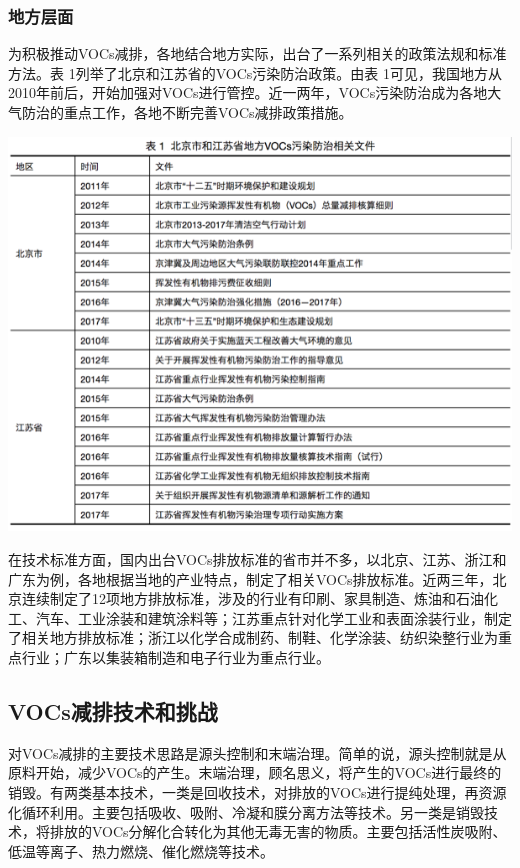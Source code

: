 \documentclass[]{book}
\begin{document}
\subsubsection{地方层面}

为积极推动VOCs减排，各地结合地方实际，出台了一系列相关的政策法规和标准方法。表
1列举了北京和江苏省的VOCs污染防治政策。由表
1可见，我国地方从2010年前后，开始加强对VOCs进行管控。近一两年，VOCs污染防治成为各地大气防治的重点工作，各地不断完善VOCs减排政策措施。

\includegraphics[width=8.33in]{images/voc7}

在技术标准方面，国内出台VOCs排放标准的省市并不多，以北京、江苏、浙江和广东为例，各地根据当地的产业特点，制定了相关VOCs排放标准。近两三年，北京连续制定了12项地方排放标准，涉及的行业有印刷、家具制造、炼油和石油化工、汽车、工业涂装和建筑涂料等；江苏重点针对化学工业和表面涂装行业，制定了相关地方排放标准；浙江以化学合成制药、制鞋、化学涂装、纺织染整行业为重点行业；广东以集装箱制造和电子行业为重点行业。

\subsection{VOCs减排技术和挑战}\label{vocs}

对VOCs减排的主要技术思路是源头控制和末端治理。简单的说，源头控制就是从原料开始，减少VOCs的产生。末端治理，顾名思义，将产生的VOCs进行最终的销毁。有两类基本技术，一类是回收技术，对排放的VOCs进行提纯处理，再资源化循环利用。主要包括吸收、吸附、冷凝和膜分离方法等技术。另一类是销毁技术，将排放的VOCs分解化合转化为其他无毒无害的物质。主要包括活性炭吸附、低温等离子、热力燃烧、催化燃烧等技术。
\end{document}
